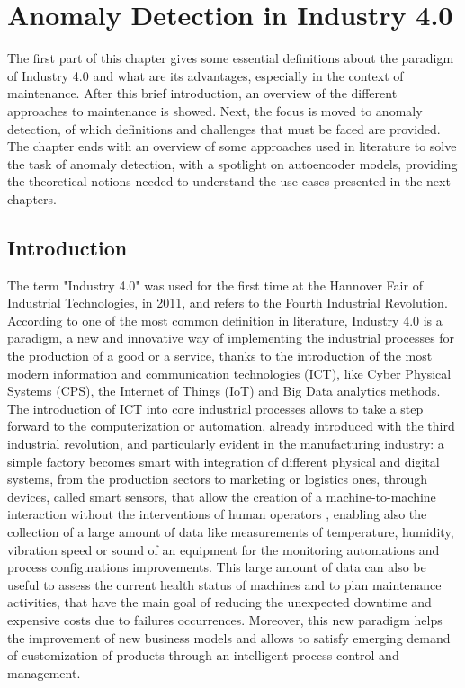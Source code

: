 \chapter{Anomaly Detection in Industry 4.0}


The first part of this chapter gives some essential definitions about the paradigm of Industry 4.0 and what are its advantages, especially in the context of maintenance. After this brief introduction, an overview of the different approaches to maintenance is showed. Next, the focus is moved to anomaly detection, of which definitions and challenges that must be faced are provided. The chapter ends with an overview of some approaches used in literature to solve the task of anomaly detection, with a spotlight on autoencoder models, providing the theoretical notions needed to understand the use cases presented in the next chapters.

\section{Introduction}
The term "Industry 4.0" was used for the first time at the Hannover Fair of Industrial Technologies, in 2011, and refers to the Fourth Industrial Revolution. According to one of the most common definition in literature, Industry 4.0 is a paradigm, a new and innovative way of implementing the industrial processes for the production of a good or a service, thanks to the introduction of the most modern information and communication technologies (ICT), like Cyber Physical Systems (CPS), the Internet of Things (IoT) and Big Data analytics methods.\\ 
The introduction of ICT into core industrial processes allows to take a step forward to the computerization or automation, already introduced with the third industrial revolution, and particularly evident in the manufacturing industry: a simple factory becomes smart with integration of different physical and digital systems, from the production sectors to marketing or logistics ones, through devices, called smart sensors, that allow the creation of a machine-to-machine interaction without the interventions of human operators \cite{1smartfactory}, enabling also the collection of a large amount of data like measurements of temperature, humidity, vibration speed or sound of an equipment for the monitoring automations and process configurations improvements. This large amount of data can also be useful to assess the current health status of machines and to plan maintenance activities, that have the main goal of reducing the unexpected downtime and expensive costs due to failures occurrences. Moreover, this new paradigm helps the improvement of new business models and allows to satisfy emerging demand of customization of products through an intelligent process control and management.


